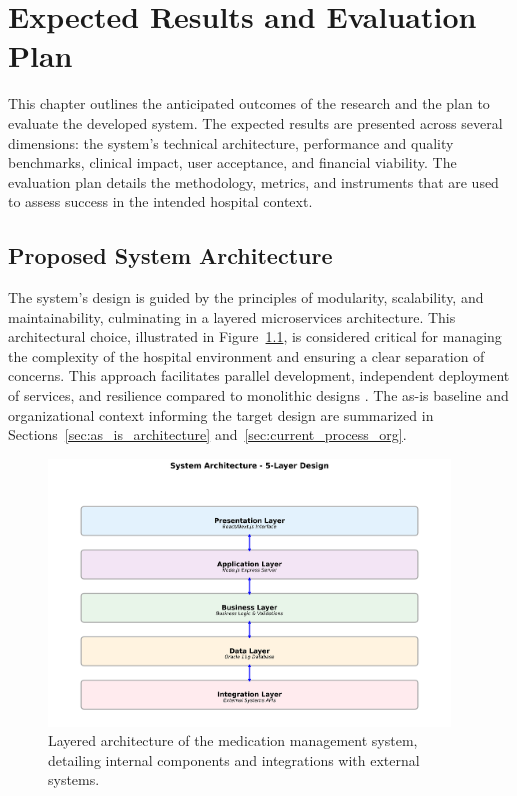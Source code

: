 \chapter{Expected Results and Evaluation Plan}
\label{chap:ExpectedResults}

This chapter outlines the anticipated outcomes of the research and the plan to evaluate the developed system. The expected results are presented across several dimensions: the system's technical architecture, performance and quality benchmarks, clinical impact, user acceptance, and financial viability. The evaluation plan details the methodology, metrics, and instruments that are used to assess success in the intended hospital context.

\section{Proposed System Architecture}

The system's design is guided by the principles of modularity, scalability, and maintainability, culminating in a layered microservices architecture. This architectural choice, illustrated in Figure~\ref{fig:architecture}, is considered critical for managing the complexity of the hospital environment and ensuring a clear separation of concerns. This approach facilitates parallel development, independent deployment of services, and resilience compared to monolithic designs \cite{newman2015}. The as-is baseline and organizational context informing the target design are summarized in Sections~\ref{sec:as_is_architecture} and~\ref{sec:current_process_org}.

\begin{figure}[htbp]
    \centering
    \includegraphics[width=0.95\textwidth]{images/generated/system_architecture.png}
    \caption{Layered architecture of the medication management system, detailing internal components and integrations with external systems.}
    \label{fig:architecture}
\end{figure}

